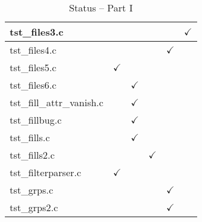 \begin{table}[H]
\begin{tabular}{|l|c|c|c|c|c|}
tst\_files3.c           &               &               &               &               &  $\checkmark$ \\ \hline
tst\_files4.c           &               &               &               & $\checkmark$  &               \\ \hline
tst\_files5.c           & $\checkmark$  &               &               &               &               \\ \hline
tst\_files6.c           &               & $\checkmark$  &               &               &               \\ \hline
tst\_fill\_attr\_vanish.c   &           & $\checkmark$  &               &               &               \\ \hline
tst\_fillbug.c          &               & $\checkmark$  &               &               &               \\ \hline
tst\_fills.c            &               & $\checkmark$  &               &               &               \\ \hline
tst\_fills2.c           &               &               & $\checkmark$  &               &               \\ \hline
tst\_filterparser.c     & $\checkmark$  &               &               &               &               \\ \hline
tst\_grps.c             &               &               &               & $\checkmark$  &               \\ \hline
tst\_grps2.c            &               &               &               & $\checkmark$  &               \\ \hline
\hline
\end{tabular}
\caption{Status -- Part I}
\end{table}

\clearpage

